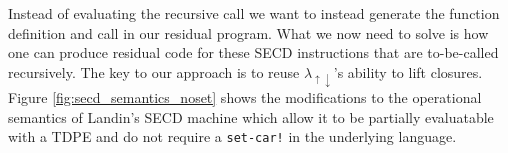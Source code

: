 \documentclass[a4paper,12pt,twoside,openright]{report}
\theoremstyle{definition}
\newcommand{\ts}{\textquotesingle}
\newcommand{\mslang}{$\lambda_{\uparrow\downarrow}$}
\begin{document}
Instead of evaluating the recursive call we want to instead generate the function definition and call in our residual program. What we now need to solve is how one can produce residual code for these SECD instructions that are to-be-called recursively. The key to our approach is to reuse \mslang's ability to lift closures. Figure \ref{fig:secd_semantics_noset} shows the modifications to the operational semantics of Landin's SECD machine \cite{landin1964mechanical} which allow it to be partially evaluatable with a TDPE and do not require a \texttt{set-car!} in the underlying language.

\begingroup
\allowdisplaybreaks
\end{document}
